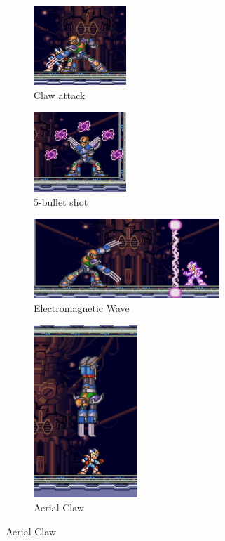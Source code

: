 \begin{figure}[htp]
	\centering
	\begin{minipage}{.64\linewidth}		
		\begin{subfigure}{.49\linewidth}
			\centering
			\includegraphics[height=3cm]{figures/X2/Hunter_stages/Sigma_claw.png}
			\caption{Claw attack}	
		\end{subfigure}
		\begin{subfigure}{.49\linewidth}
			\centering
			\includegraphics[height=3cm]{figures/X2/Hunter_stages/Sigma_spark.png}
			\caption{5-bullet shot}
		\end{subfigure}
		\begin{subfigure}{\linewidth}
			\centering
			\includegraphics[height=3cm]{figures/X2/Hunter_stages/Sigma_electric_wall.png}
			\caption{Electromagnetic Wave}
		\end{subfigure}
	\end{minipage}
	\begin{minipage}{0.35\linewidth}		
		\begin{subfigure}{\linewidth}
			\centering
			\includegraphics[height=6.5cm]{figures/X2/Hunter_stages/Sigma_dive.png}
			\caption{Aerial Claw}
		\end{subfigure}
	\end{minipage}	
\end{figure}

